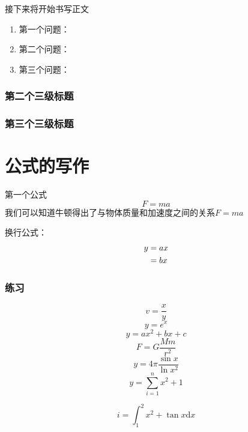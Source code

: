 \documentclass[UTF8]{ctexart}
\begin{document}
接下来将开始书写正文
\begin{enumerate}
	\item 第一个问题：
	\item 第二个问题：
	\item 第三个问题：
\end{enumerate}

\subsubsection{第二个三级标题}


\subsubsection{第三个三级标题}

\section{公式的写作}
第一个公式
\begin{equation}
	F=ma
\end{equation}
我们可以知道牛顿得出了与物体质量和加速度之间的关系$F=ma$

换行公式：
\begin{align}
	y & =ax\notag \\
	  & =bx
\end{align}

\subsubsection{练习}
\begin{equation}
	v=\frac{x}{y}
\end{equation}
\begin{equation}
	y=e^{x}
\end{equation}
\begin{equation}
	y=ax^2+bx+c
\end{equation}
\begin{equation}
	F=G\frac{Mm}{r^2}
\end{equation}
\begin{equation}
	y=4\pi \frac{\sin{x}}{\ln{x^2}}
\end{equation}
\begin{equation}
	\label{eq:ceshi}
	y=\sum^{n}_{i=1} x^2+1
\end{equation}


\begin{equation}
	i=\int_{1}^{2}x^2+\tan{x}\mathrm{d}x
\end{equation}
\end{document}
